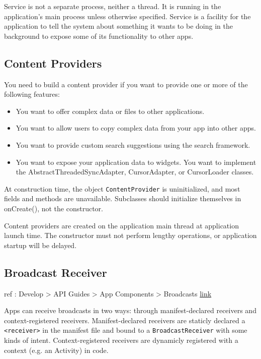 
Service is not a separate process, neither a thread. It is running in the
application's main process unless otherwise specified. Service is a facility for
the application to tell the system about something it wants to be doing in the
background to expose some of its functionality to other apps.


\subsection{Content Providers}

You need to build a content provider if you want to provide one or more of the
following features:
\begin{itemize}
\item You want to offer complex data or files to other applications.
\item You want to allow users to copy complex data from your app into other
  apps.
\item You want to provide custom search suggestions using the search framework.
\item You want to expose your application data to widgets. You want to implement
  the AbstractThreadedSyncAdapter, CursorAdapter, or CursorLoader classes.
\end{itemize}

At construction time, the object \texttt{ContentProvider} is uninitialized, and
most fields and methods are unavailable. Subclasses should initialize themselves
in onCreate(), not the constructor.

Content providers are created on the application main thread at application
launch time. The constructor must not perform lengthy operations, or application
startup will be delayed.


\subsection{Broadcast Receiver}

ref : Develop > API Guides > App Components > Broadcasts
\href{https://developer.android.com/guide/components/broadcasts.html}{link}

Apps can receive broadcasts in two ways: through manifest-declared receivers and
context-registered receivers. Manifest-declared receivers are staticly declared
a \texttt{<receiver>} in the manifest file and bound to a
\texttt{BroadcastReceiver} with some kinds of intent. Context-registered
receivers are dynamicly registered with a context (e.g. an Activity) in code.

